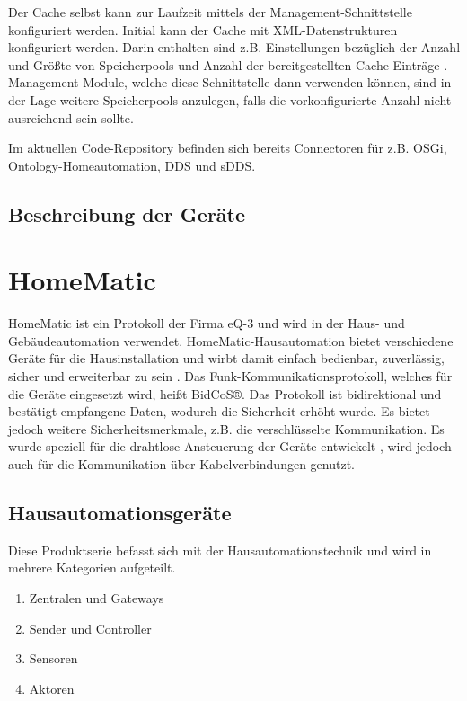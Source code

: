 Der Cache selbst kann zur Laufzeit mittels der Management-Schnittstelle konfiguriert werden.
Initial kann der Cache mit XML-Datenstrukturen konfiguriert werden.
Darin enthalten sind z.B. Einstellungen bezüglich der Anzahl und Größte von Speicherpools und Anzahl
der bereitgestellten Cache-Einträge \cite{aalcache}.
Management-Module, welche diese Schnittstelle dann verwenden können, sind in der Lage weitere Speicherpools
anzulegen, falls die vorkonfigurierte Anzahl nicht ausreichend sein sollte.

Im aktuellen Code-Repository befinden sich bereits Connectoren für z.B. OSGi, Ontology-Homeautomation,
DDS und sDDS.

\subsection{Beschreibung der Geräte}

\section{HomeMatic}

HomeMatic ist ein Protokoll der Firma eQ-3 und wird in der Haus- und Gebäudeautomation
verwendet.
HomeMatic-Hausautomation bietet verschiedene Geräte für die Hausinstallation und wirbt damit einfach bedienbar,
zuverlässig, sicher und erweiterbar zu sein \cite{homematic_eq3}.
Das Funk-Kommunikationsprotokoll, welches für die Geräte eingesetzt wird, heißt BidCoS®.
Das Protokoll ist bidirektional und bestätigt empfangene Daten, wodurch die Sicherheit
erhöht wurde.
Es bietet jedoch weitere Sicherheitsmerkmale, z.B. die verschlüsselte Kommunikation.
Es wurde speziell für die drahtlose Ansteuerung der Geräte entwickelt \cite{homematic_eq3_faq},
wird jedoch auch für die Kommunikation über Kabelverbindungen genutzt.

\subsection{Hausautomationsgeräte}

Diese Produktserie befasst sich mit der Hausautomationstechnik und wird in mehrere
Kategorien aufgeteilt.
\begin{enumerate}
\item{Zentralen und Gateways}
\item{Sender und Controller}
\item{Sensoren}
\item{Aktoren}
\end{enumerate}

